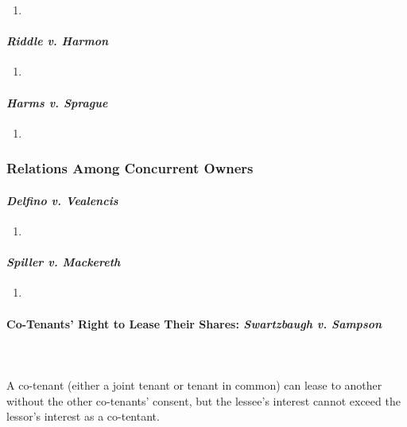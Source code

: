 \begin{enumerate}
    \item %
\end{enumerate}


\paragraph{\emph{Riddle v. Harmon}}

\begin{enumerate}
    \item %
\end{enumerate}

\paragraph{\emph{Harms v. Sprague}}

\begin{enumerate}
    \item %
\end{enumerate}

\subsubsection{Relations Among Concurrent Owners}

\paragraph{\emph{Delfino v. Vealencis}}

\begin{enumerate}
    \item %
\end{enumerate}

\paragraph{\emph{Spiller v. Mackereth}}

\begin{enumerate}
    \item %
\end{enumerate}

\paragraph{Co-Tenants' Right to Lease Their Shares: \emph{Swartzbaugh v. 
Sampson}}
~\\\\
A co-tenant (either a joint tenant or tenant in common)  can lease to another 
without the other co-tenants' consent, but the lessee's interest cannot exceed 
the lessor's interest as a co-tentant.

